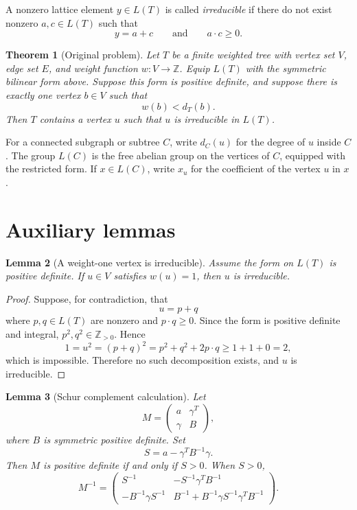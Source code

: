 \documentclass[12pt]{article}
\newcommand{\Z}{\mathbb{Z}}
\newtheorem{theorem}{Theorem}
\newtheorem{lemma}[theorem]{Lemma}
\begin{document}
A nonzero lattice element \(y\in L(T)\) is called \emph{irreducible} if there do not exist nonzero \(a,c\in L(T)\) such that
\[
y=a+c
\qquad\text{and}\qquad
a\cdot c\ge 0.
\]

\begin{theorem}[Original problem]\label{thm:main}
Let \(T\) be a finite weighted tree with vertex set \(V\), edge set \(E\), and weight function \(w:V\to\Z\). Equip \(L(T)\) with the symmetric bilinear form above. Suppose this form is positive definite, and suppose there is exactly one vertex \(b\in V\) such that
\[
w(b)<d_T(b).
\]
Then \(T\) contains a vertex \(u\) such that \(u\) is irreducible in \(L(T)\).
\end{theorem}

For a connected subgraph or subtree \(C\), write \(d_C(u)\) for the degree of \(u\) inside \(C\). The group \(L(C)\) is the free abelian group on the vertices of \(C\), equipped with the restricted form. If \(x\in L(C)\), write \(x_u\) for the coefficient of the vertex \(u\) in \(x\).

\section*{Auxiliary lemmas}

\begin{lemma}[A weight-one vertex is irreducible]\label{lem:weight-one}
Assume the form on \(L(T)\) is positive definite. If \(u\in V\) satisfies \(w(u)=1\), then \(u\) is irreducible.
\end{lemma}

\begin{proof}
Suppose, for contradiction, that
\[
u=p+q
\]
where \(p,q\in L(T)\) are nonzero and \(p\cdot q\ge 0\). Since the form is positive definite and integral, \(p^2,q^2\in\Z_{>0}\). Hence
\[
1=u^2=(p+q)^2=p^2+q^2+2p\cdot q
\ge 1+1+0=2,
\]
which is impossible. Therefore no such decomposition exists, and \(u\) is irreducible.
\end{proof}

\begin{lemma}[Schur complement calculation]\label{lem:schur}
Let
\[
M=
\begin{pmatrix}
a & \gamma^T\\
\gamma & B
\end{pmatrix},
\]
where \(B\) is symmetric positive definite. Set
\[
S=a-\gamma^T B^{-1}\gamma.
\]
Then \(M\) is positive definite if and only if \(S>0\). When \(S>0\),
\[
M^{-1}=
\begin{pmatrix}
S^{-1} & -S^{-1}\gamma^T B^{-1}\\
-B^{-1}\gamma S^{-1} &
B^{-1}+B^{-1}\gamma S^{-1}\gamma^T B^{-1}
\end{pmatrix}.
\]
\end{lemma}
\end{document}
